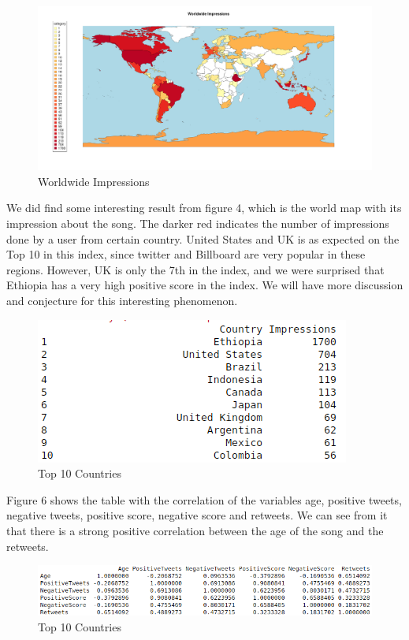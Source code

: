 \documentclass{article}
\begin{document}
\begin{figure}[H]
  \centering
  \includegraphics[scale=0.3]{worldwide_impressions.png}
  \caption{Worldwide Impressions}
\end{figure}

We did find some interesting result from figure 4, which is the world map with its impression about the song. The darker red indicates the number of impressions done by a user from certain country. United States and UK is as expected on the Top 10 in this index, since twitter and Billboard are very popular in these regions. However, UK is only the 7th in the index, and we were surprised that Ethiopia has a very high positive score in the index.  We will have more discussion and conjecture for this interesting phenomenon.
\begin{figure}[H]
  \centering
  \includegraphics[scale=0.3]{top_10_countries.png}
  \caption{Top 10 Countries}
\end{figure}
Figure 6 shows the table with the correlation of the variables age, positive tweets, negative tweets, positive score, negative score and retweets.  We can see from it that there is a strong positive correlation between the age of the song and the retweets.
\begin{figure}[H]
  \centering
  \includegraphics[scale=0.3]{Correlation.png}
  \caption{Top 10 Countries}
\end{figure}
\end{document}
